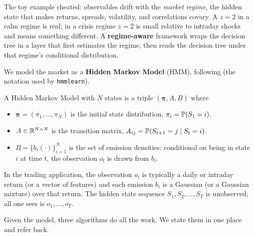 The toy example cheated: observables drift with the \emph{market
regime}, the hidden state that makes returns, spreads,
volatility, and correlations covary. A $z = 2$ in a calm regime is
real; in a crisis regime $z = 2$ is small relative to intraday
shocks and means something different. A \textbf{regime-aware}
framework wraps the decision tree in a layer that first estimates
the regime, then reads the decision tree under that regime's
conditional distribution.

We model the market as a \textbf{Hidden Markov Model} (HMM),
following \citep{rabiner1989tutorial} (the notation used by
\texttt{hmmlearn}).

\begin{definition}
\label{def:wsw_hmm}
A Hidden Markov Model with $N$ states is a triple
$(\boldsymbol{\pi}, A, B)$ where
\begin{itemize}
  \item $\boldsymbol{\pi} = (\pi_1, \ldots, \pi_N)$ is the
  initial state distribution, $\pi_i = \mathbb{P}(S_1 = i)$.
  \item $A \in \mathbb{R}^{N\times N}$ is the transition matrix,
  $A_{ij} = \mathbb{P}(S_{t+1} = j \mid S_t = i)$.
  \item $B = \{b_i(\cdot)\}_{i=1}^N$ is the set of
  emission densities: conditional on being in state $i$ at
  time $t$, the observation $o_t$ is drawn from $b_i$.
\end{itemize}
In the trading application, the observation $o_t$ is typically a
daily or intraday return (or a vector of features) and each
emission $b_i$ is a Gaussian (or a Gaussian mixture) over that
return. The hidden state sequence $S_1, S_2, \ldots, S_T$ is
unobserved; all one sees is $o_1, \ldots, o_T$.
\end{definition}

Given the model, three algorithms do all the work. We state them in
one place and refer back.

